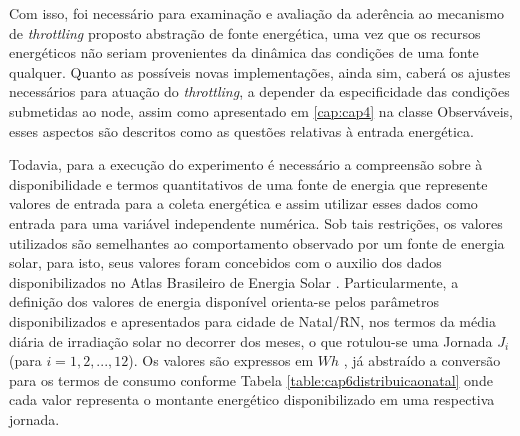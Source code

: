 Com isso, foi necessário para examinação e avaliação da aderência ao mecanismo de \textit{throttling} proposto abstração de fonte energética, uma vez que os recursos energéticos não seriam provenientes da dinâmica das condições de uma fonte qualquer. Quanto as possíveis novas implementações, ainda sim, caberá os ajustes necessários para atuação do \textit{throttling},  a depender da especificidade das condições submetidas ao node, assim como apresentado em \ref{cap:cap4} na classe Observáveis, esses aspectos são descritos como as questões relativas à entrada energética. 

Todavia, para a execução do experimento é necessário a compreensão sobre à disponibilidade e termos quantitativos de uma fonte de energia que represente valores de entrada para a coleta energética e assim utilizar esses dados como entrada para uma variável independente numérica. Sob tais restrições, os valores utilizados são semelhantes ao comportamento observado por um fonte de energia solar, para isto, seus valores foram concebidos com o auxilio dos dados disponibilizados no Atlas Brasileiro de Energia Solar \cite{martins2017atlas}. Particularmente, a definição dos valores de energia disponível orienta-se pelos parâmetros disponibilizados e apresentados para cidade de Natal/RN, nos termos da média diária de irradiação solar no decorrer  dos meses, o que rotulou-se uma Jornada $J_i$ (para $i = 1,2,...,12$). Os valores são expressos em  $Wh$ , já abstraído a conversão para os termos de consumo conforme Tabela \ref{table:cap6distribuicaonatal} onde cada valor representa o montante energético disponibilizado em uma respectiva jornada.

\begingroup

\setlength{\tabcolsep}{10pt} %
\renewcommand{\arraystretch}{1.5} %


